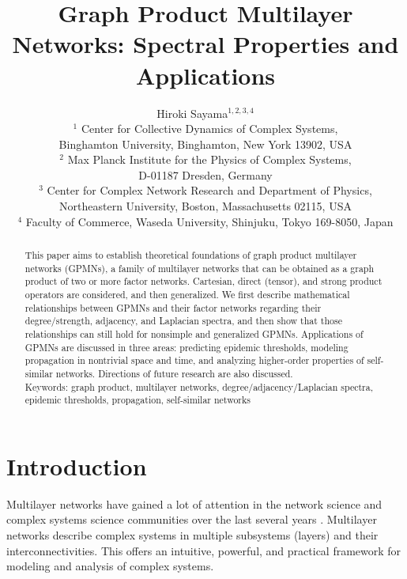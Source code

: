 \documentclass{article}
\begin{document}
\title{Graph Product Multilayer Networks: Spectral Properties and Applications}

\author{Hiroki Sayama$^{1,2,3,4}$\\
$^1$ Center for Collective Dynamics of Complex Systems,\\
Binghamton University, Binghamton, New York 13902, USA\\
$^2$ Max Planck Institute for the Physics of Complex Systems,\\
D-01187 Dresden, Germany\\
$^3$ Center for Complex Network Research and Department of Physics,\\
Northeastern University, Boston, Massachusetts 02115, USA\\
$^4$ Faculty of Commerce, Waseda University, Shinjuku, Tokyo 169-8050, Japan}

\date{}

\maketitle

\begin{abstract}
This paper aims to establish theoretical foundations of graph product
multilayer networks (GPMNs), a family of multilayer networks that can
be obtained as a graph product of two or more factor networks.
Cartesian, direct (tensor), and strong product operators are
considered, and then generalized. We first describe mathematical
relationships between GPMNs and their factor networks regarding their
degree/strength, adjacency, and Laplacian spectra, and then show that
those relationships can still hold for nonsimple and generalized
GPMNs. Applications of GPMNs are discussed in three areas: predicting
epidemic thresholds, modeling propagation in nontrivial space and
time, and analyzing higher-order properties of self-similar
networks. Directions of future research are also discussed.\\
Keywords: graph product, multilayer networks, degree/adjacency/Laplacian spectra, epidemic thresholds, propagation, self-similar networks
\end{abstract}

\section{Introduction}
\label{sec:intro}

Multilayer networks have gained a lot of attention in the network
science and complex systems science communities over the last several
years \cite{kivela2014multilayer,boccaletti2014structure,dedomenico2016}. Multilayer
networks describe complex systems in multiple subsystems (layers) and
their interconnectivities. This offers an intuitive, powerful, and
practical framework for modeling and analysis of complex systems.
\end{document}
